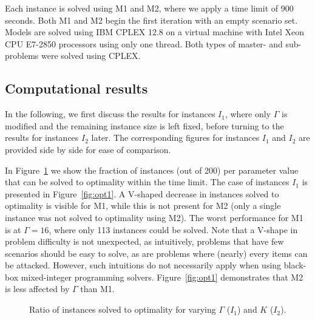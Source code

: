 Each instance is solved using M1 and M2, where we apply a time limit of 900 seconds. 
Both M1 and M2 begin the first iteration with an empty scenario set.
Models are solved using IBM CPLEX 12.8 on a virtual machine with Intel Xeon CPU E7-2850 processors using only one thread. Both types of master- and sub-problems were solved using CPLEX.

\subsection{Computational results}

In the following, we first discuss the results for instances $I_1$, where only $\Gamma$ is modified and the remaining instance size is left fixed, before turning to the results for instances $I_2$ later. The corresponding figures for instances $I_1$ and $I_2$ are provided side by side for ease of comparison.

In Figure~\ref{fig:opt} we show the fraction of instances (out of 200) per parameter value that can be solved to optimality within the time limit. The case of instances $I_1$ is presented in Figure~\ref{fig:opt1}. A V-shaped decrease in instances solved to optimality is visible for M1, while this is not present for M2 (only a single instance was not solved to optimality using M2). The worst performance for M1 is at $\Gamma=16$, where only 113 instances could be solved. 
Note that a V-shape in problem difficulty is not unexpected, as intuitively, problems that have few scenarios should be easy to solve, as are problems where (nearly) every items can be attacked. However, such intuitions do not necessarily apply when using black-box mixed-integer programming solvers.
Figure~\ref{fig:opt1} demonstrates that M2 is less affected by $\Gamma$ than M1. 

\begin{figure}[htb]
\begin{center}
%
\hfill
{}
\end{center}
\caption{Ratio of instances solved to optimality for varying $\Gamma$ ($I_1$) and $K$ ($I_2$).\label{fig:opt}}
\end{figure}

